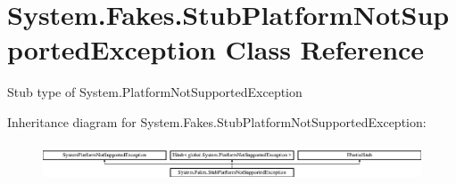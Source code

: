 \hypertarget{class_system_1_1_fakes_1_1_stub_platform_not_supported_exception}{\section{System.\-Fakes.\-Stub\-Platform\-Not\-Supported\-Exception Class Reference}
\label{class_system_1_1_fakes_1_1_stub_platform_not_supported_exception}
}


Stub type of System.\-Platform\-Not\-Supported\-Exception 


Inheritance diagram for System.\-Fakes.\-Stub\-Platform\-Not\-Supported\-Exception\-:\begin{figure}[H]
\begin{center}
\leavevmode
\includegraphics[height=1.124498cm]{class_system_1_1_fakes_1_1_stub_platform_not_supported_exception}
\end{center}
\end{figure}
